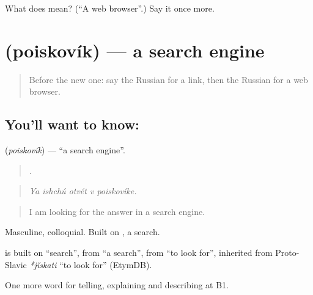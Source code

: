 \begin{tcolorbox}[breakable,colback=teal!4,colframe=teal!35!black,title={Before you move on}]
What does  mean? (\textquotedblleft{}A web browser\textquotedblright{}.) Say it once more.
\end{tcolorbox}
\section[\texorpdfstring{\ru{поисковик} (poiskovík)}{поисковик (poiskovík)}]{ (poiskovík) — a search engine}

\label{lesson:RU-C399-poiskovik}



\begin{quote}
Before the new one: say the Russian for a link, then the Russian for a web browser.
\end{quote}

\subsection*{You'll want to know: }
\textbf{} (\emph{poiskovík}) — \textquotedblleft{}a search engine\textquotedblright{}.

\begin{quote}
    .
\end{quote}

\begin{quote}
\emph{Ya ishchú otvét v poiskovíke.}
\end{quote}

\begin{quote}
I am looking for the answer in a search engine.
\end{quote}

Masculine, colloquial. Built on \emph{}, a search.

\begin{cousinweb}
\textbf{} is built on \emph{} \textquotedblleft{}search\textquotedblright{}, from \emph{} \textquotedblleft{}a search\textquotedblright{}, from \emph{} \textquotedblleft{}to look for\textquotedblright{}, inherited from Proto-Slavic \emph{*jĭskati} \textquotedblleft{}to look for\textquotedblright{} (EtymDB).
\end{cousinweb}

\begin{grammarlens}[title={What you've built}]
One more word for telling, explaining and describing at B1.
\end{grammarlens}

